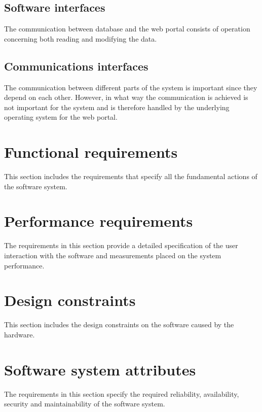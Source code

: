 \documentclass[../main.tex]{subfiles}
\begin{document}
	\subsection{Software interfaces}
		The communication between database and the web portal consists of operation concerning both reading and modifying the data.
	\subsection{Communications interfaces}
		The communication between different parts of the system is important since they depend on each other. However, in what way the communication is achieved is not important for the system and is therefore handled by the underlying operating system for the web portal. 
	\section{Functional requirements}
		 This section includes the requirements that specify all the fundamental actions of the software system.
	\section{Performance requirements}
		The requirements in this section provide a detailed specification of the user interaction with the software and measurements placed on the system performance.
	\section{Design constraints}
		This section includes the design constraints on the software caused by the hardware.
	\section{Software system attributes}
		The requirements in this section specify the required reliability, availability, security and maintainability of the software system. 
\end{document}
